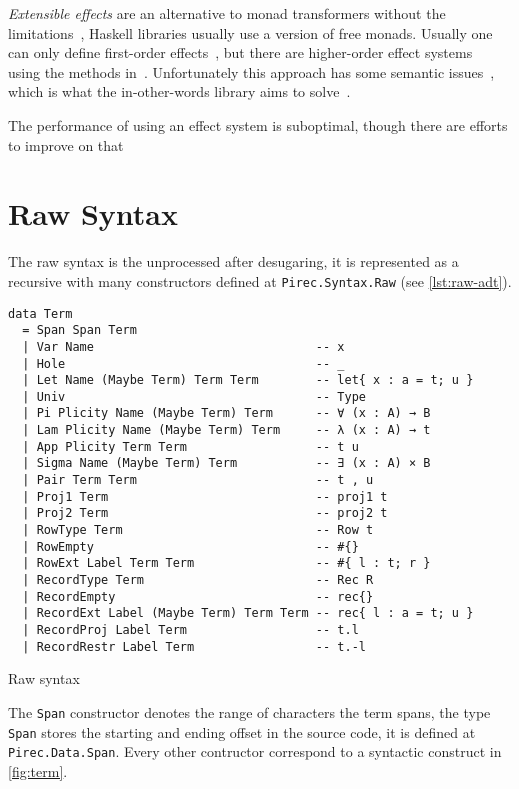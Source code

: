 \emph{Extensible effects} are an alternative to monad transformers without the
limitations~\cite{extensible}, Haskell libraries usually use a version of free
monads. Usually one can only define first-order effects~\cite{freersimple}, but
there are higher-order effect systems~\cite{fusedeffects, polysemy} using the
methods in~\cite{effectscope}. Unfortunately this approach has some semantic
issues~\cite{polysemy-nondet}, which is what the in-other-words library aims to
solve~\cite{inotherwords}.

The performance of using an effect system is suboptimal, though there are
efforts to improve on that~\cite{eff, ghcdelim}

\section{Raw Syntax}\label{sec:raw}

The raw syntax is the unprocessed  after desugaring, it is represented
as a recursive  with many constructors defined at
\texttt{Pirec.Syntax.Raw} (see \cref{lst:raw-adt}).

\begin{listing}
  \begin{verbatim}
data Term
  = Span Span Term
  | Var Name                               -- x
  | Hole                                   -- _
  | Let Name (Maybe Term) Term Term        -- let{ x : a = t; u }
  | Univ                                   -- Type
  | Pi Plicity Name (Maybe Term) Term      -- ∀ (x : A) → B
  | Lam Plicity Name (Maybe Term) Term     -- λ (x : A) → t
  | App Plicity Term Term                  -- t u
  | Sigma Name (Maybe Term) Term           -- ∃ (x : A) × B
  | Pair Term Term                         -- t , u
  | Proj1 Term                             -- proj1 t
  | Proj2 Term                             -- proj2 t
  | RowType Term                           -- Row t
  | RowEmpty                               -- #{}
  | RowExt Label Term Term                 -- #{ l : t; r }
  | RecordType Term                        -- Rec R
  | RecordEmpty                            -- rec{}
  | RecordExt Label (Maybe Term) Term Term -- rec{ l : a = t; u }
  | RecordProj Label Term                  -- t.l
  | RecordRestr Label Term                 -- t.-l
  \end{verbatim}
  \caption{Raw syntax }\label{lst:raw-adt}
\end{listing}

The \texttt{Span} constructor denotes the range of characters the term
spans, the type \texttt{Span} stores the starting and ending offset
in the source code, it is defined at \texttt{Pirec.Data.Span}. Every other
contructor correspond to a syntactic construct in \cref{fig:term}.


